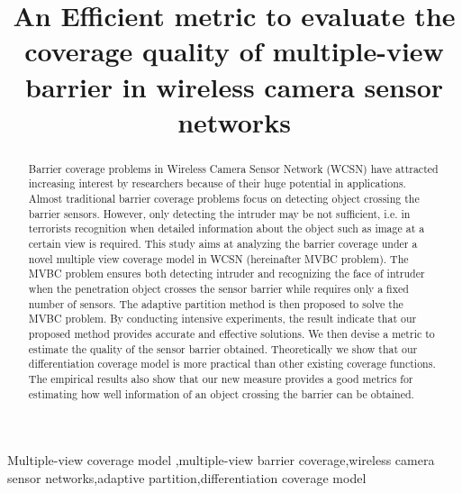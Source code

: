 \documentclass[3p]{elsarticle}
\begin{document}
\begin{frontmatter}

\title{ An Efficient metric to evaluate the coverage quality of multiple-view barrier in wireless camera sensor networks}


\begin{abstract}
Barrier coverage problems in Wireless Camera Sensor Network (WCSN) have attracted increasing interest by researchers because of their huge potential in applications. Almost traditional barrier coverage problems focus on detecting object crossing the barrier sensors. However, only detecting the intruder may be not sufficient, i.e. in terrorists recognition when detailed information about the object such as image at a certain view is required. This study aims at analyzing the barrier coverage under a novel multiple view coverage model in WCSN (hereinafter MVBC problem). The MVBC problem ensures both detecting intruder and recognizing the face of intruder when the penetration object crosses the sensor barrier while requires only a fixed number of sensors. The adaptive partition method is then proposed to solve the MVBC problem. By conducting intensive experiments, the result indicate that our proposed method provides accurate and effective solutions. We then devise a metric to estimate the quality of the sensor barrier obtained. Theoretically we show that our differentiation coverage model is more practical than other existing coverage functions. The empirical results also show that our new measure provides a good metrics for estimating how well information of an object crossing the barrier can be obtained.
\end{abstract}

\begin{keyword}
Multiple-view coverage model \sep multiple-view barrier coverage\sep wireless camera sensor networks\sep adaptive partition\sep differentiation coverage model
\end{keyword}

\end{frontmatter}
\end{document}
